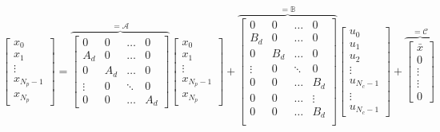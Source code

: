 \documentclass[a4paper,12pt,fleqn]{article}
\newcommand{\Np}{{N_p}}
\newcommand{\Nc}{{N_c}}
\begin{document}
\begin{equation}
\begin{bmatrix}
x_0\\
x_1\\
\vdots\\
x_{\Np-1}\\
x_{\Np}
\end{bmatrix}=
\overbrace{
\begin{bmatrix}
 0      &0      &\dots  &0\\
 A_d    &0      &\dots  & 0\\
 0      &A_d    &\dots  &0\\
 \vdots &0      &\ddots & 0\\
 0      &0      &\dots  &A_d
\end{bmatrix}
}^{=\mathcal{A}}
\begin{bmatrix}
x_0\\
x_1\\
\vdots\\
x_{\Np-1}\\
x_{\Np} 
\end{bmatrix} +
\overbrace{
\begin{bmatrix}
 0      &0      &\dots  &0\\
 B_d    &0      &\dots  & 0\\
 0      &B_d    &\dots  &0\\
 \vdots &0      &\ddots & 0\\
 0      &0      &\dots  &B_d\\
 0      &0      &\dots  &\vdots\\
 0      &0      &\dots  &B_d\\
\end{bmatrix}
}^{=\mathbb B}
\begin{bmatrix}
u_0\\
u_1\\
u_2\\
\vdots\\
u_{\Nc-1}\\
\vdots\\
u_{\Nc-1}
\end{bmatrix} +
\overbrace{
\begin{bmatrix}
\bar x\\
0\\
\vdots\\
\vdots \\
0 
\end{bmatrix}
}^{=\mathcal{C}}
\end{equation}
\end{document}
